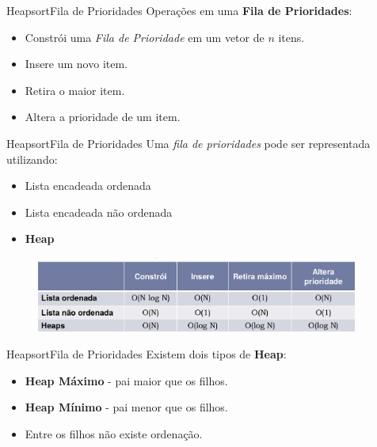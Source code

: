 \documentclass[aspectratio=169]{beamer}
\begin{document}
\begin{frame}{Heapsort}{Fila de Prioridades}
Operações em uma {\bf Fila de Prioridades}:
\begin{itemize}
\item Constrói uma {\it Fila de Prioridade} em um vetor de $n$ itens.
\item Insere um novo item.
\item Retira o maior item.
\item Altera a prioridade de um item.

\end{itemize}
\end{frame}


\begin{frame}{Heapsort}{Fila de Prioridades}
Uma {\it fila de prioridades} pode ser representada utilizando:
\begin{itemize}
\item Lista encadeada ordenada
\item Lista encadeada não ordenada
\item {\bf Heap}
\end{itemize}
\begin{figure}[!h]
  \centering
  \includegraphics[width=300pt]{imgs/fila_prioridade_comparativo.png}
  \label{fig_fila_prioridade_comparativo}
\end{figure}
\end{frame}


\begin{frame}{Heapsort}{Fila de Prioridades}
Existem dois tipos de {\bf Heap}:
\begin{itemize}
\item {\bf Heap Máximo} - pai maior que os filhos.
\item {\bf Heap Mínimo} - pai menor que os filhos.
\item Entre os filhos não existe ordenação.
\end{itemize}
\end{frame}
\end{document}
